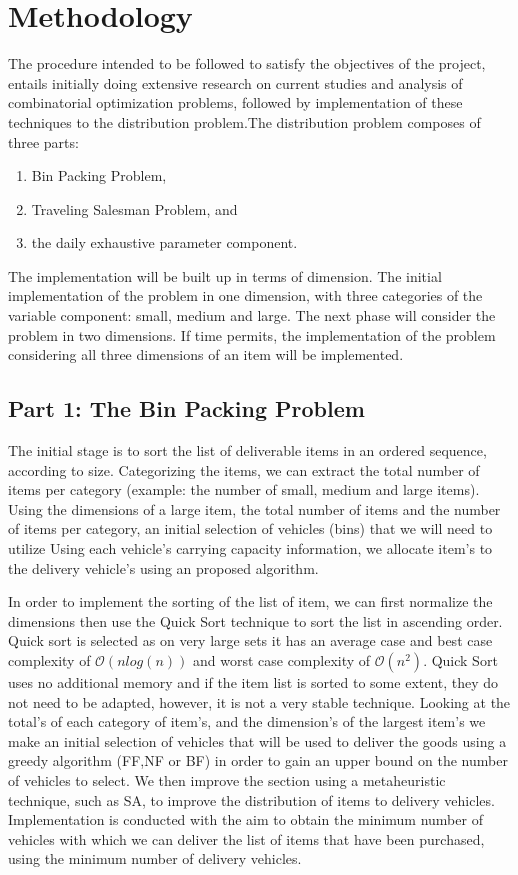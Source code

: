 \newpage
\section{Methodology}
The procedure intended to be followed to satisfy the objectives of the project, entails initially doing extensive research on current studies and analysis of combinatorial optimization problems, followed by implementation of these techniques to the distribution problem.The distribution problem composes of three  parts: 
\begin{enumerate}
\item Bin Packing Problem,
\item Traveling Salesman Problem, and
\item the daily exhaustive parameter component.
\end{enumerate}
The implementation will be built up in terms of dimension. The initial implementation of the problem in one dimension, with three categories of the variable component: small, medium and large. The next phase will consider the problem in two dimensions. If time permits, the implementation of the problem considering all three dimensions of an item will be implemented. 


\subsection{Part 1: The Bin Packing Problem}
\begin{flushleft}
The initial stage is to sort the list of deliverable items in an ordered  sequence, according to size. Categorizing the items, we can extract the total number of items per category (example: the number of  small, medium and large items). Using the dimensions of a large item, the total number of items and the number of items per category, an initial selection of vehicles (bins) that we will need to utilize Using each vehicle's carrying capacity information, we allocate item's to the delivery vehicle's using an proposed algorithm. 
\end{flushleft}
\begin{flushleft}
In order to implement the sorting of the list of item, we can first  normalize the dimensions then use the Quick Sort technique to sort the list in ascending order. Quick sort is selected as on very large sets it has an average case and best case complexity of $\mathcal{O}(nlog(n))$ and worst case complexity of $\mathcal{O}(n^2)$. Quick Sort uses  no additional memory  and if the item list is sorted to some extent, they do not need to be adapted, however, it is not a very stable technique.  Looking at the total's of each category of item's, and the dimension's of the largest item's we make an initial selection of vehicles that will be used to deliver the goods using a greedy algorithm (FF,NF or BF) in order to gain an upper bound on the number of vehicles to select. We then improve the section using a metaheuristic technique, such as SA, to improve the distribution of items to delivery vehicles.  Implementation is conducted with the aim to obtain the minimum number of vehicles with which we can deliver the list of items that have been purchased, using the minimum number of delivery vehicles.
\end{flushleft}
